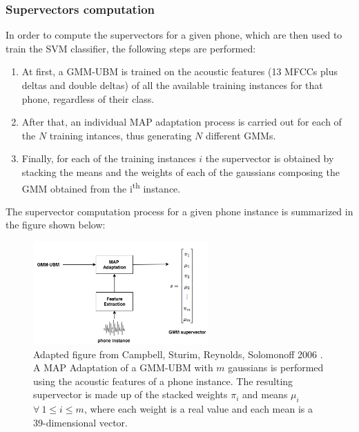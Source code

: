\subsubsection{Supervectors computation}

In order to compute the supervectors for a given phone, which are then used to train the SVM
classifier, the following steps are performed:

\begin{enumerate}
  \item At first, a GMM-UBM is trained on the acoustic features (13 MFCCs plus deltas and double
  deltas) of all the available training instances for that phone, regardless of their class.
  \item After that, an individual MAP adaptation process is carried out for each
  of the $N$ training intances, thus generating $N$ different GMMs.
  \item Finally, for each of the training instances $i$ the supervector is obtained by stacking
  the means and the weights of each of the gaussians composing the GMM obtained from the
  i\textsuperscript{th} instance.
\end{enumerate}

The supervector computation process for a given phone instance
is summarized in the figure shown below:

\begin{figure}[H]
  \centering
  \includegraphics[width=0.6\textwidth]{files/figures/method/supervectors_extraction}
  \caption{
    Adapted figure from Campbell, Sturim, Reynolds, Solomonoff 2006 \cite{supervectors}.
    A MAP Adaptation of a GMM-UBM with $m$ gaussians
    is performed using the acoustic features of a phone instance.
    The resulting supervector is made up of the stacked weights $\pi_{i}$ and means
    $\mu_{i}$ $\forall \ 1 \leq i \leq m$, where each weight is a real value and each
    mean is a 39-dimensional vector.
  }
\end{figure}

